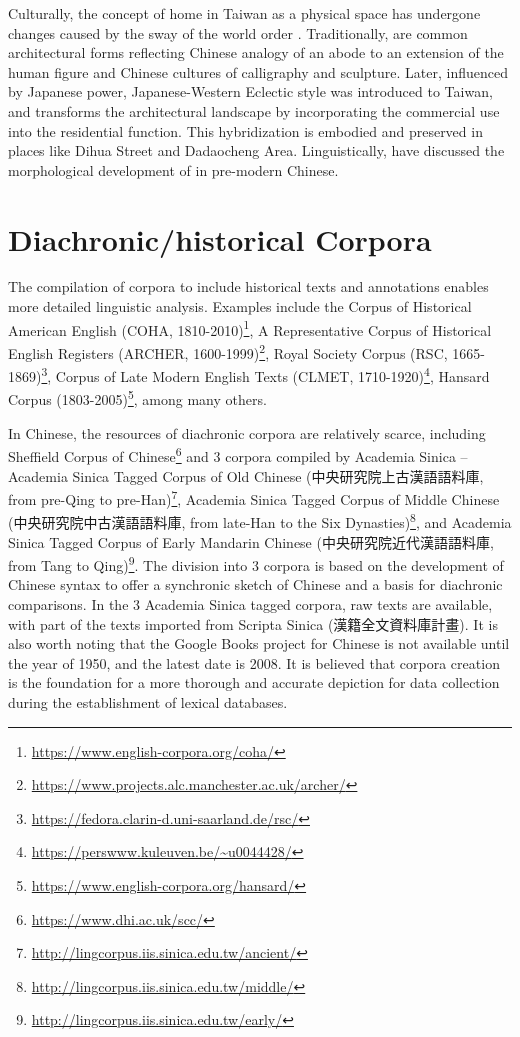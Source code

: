 Culturally, the concept of home in Taiwan as a physical space has undergone changes caused by the sway of the world order \parencite{沈孟穎2015台灣現代住宅設計之轉化}. Traditionally,  are common architectural forms reflecting Chinese analogy of an abode to an extension of the human figure and Chinese cultures of calligraphy and sculpture. Later, influenced by Japanese power, Japanese-Western Eclectic style was introduced to Taiwan, and  transforms the architectural landscape by incorporating the commercial use into the residential function. This hybridization is embodied and preserved in places like Dihua Street and Dadaocheng Area. Linguistically, \textcite{wang2005jia} have discussed the morphological development of \jia in pre-modern Chinese.

\section{Diachronic/historical Corpora}
The compilation of corpora to include historical texts and annotations enables more detailed linguistic analysis. Examples include
the Corpus of Historical American English (COHA, 1810-2010)\footnote{\url{https://www.english-corpora.org/coha/}},
A Representative Corpus of Historical English Registers (ARCHER, 1600-1999)\footnote{\url{https://www.projects.alc.manchester.ac.uk/archer/}},
Royal Society Corpus (RSC, 1665-1869)\footnote{\url{https://fedora.clarin-d.uni-saarland.de/rsc/}},
Corpus of Late Modern English Texts (CLMET, 1710-1920)\footnote{\url{https://perswww.kuleuven.be/~u0044428/}}, 
Hansard Corpus (1803-2005)\footnote{\url{https://www.english-corpora.org/hansard/}}, among many others.

In Chinese, the resources of diachronic corpora are relatively scarce, including Sheffield Corpus of Chinese\footnote{\url{https://www.dhi.ac.uk/scc/}} and 3 corpora compiled by Academia Sinica \parencite{wei1997corpus}--Academia Sinica Tagged Corpus of Old Chinese (中央研究院上古漢語語料庫, from pre-Qing to pre-Han)\footnote{\url{http://lingcorpus.iis.sinica.edu.tw/ancient/}}, Academia Sinica Tagged Corpus of Middle Chinese (中央研究院中古漢語語料庫, from late-Han to the Six Dynasties)\footnote{\url{http://lingcorpus.iis.sinica.edu.tw/middle/}}, and Academia Sinica Tagged Corpus of Early Mandarin Chinese (中央研究院近代漢語語料庫, from Tang to Qing)\footnote{\url{http://lingcorpus.iis.sinica.edu.tw/early/}}. The division into 3 corpora is based on the development of Chinese syntax to offer a synchronic sketch of Chinese and a basis for diachronic comparisons. In the 3 Academia Sinica tagged corpora, raw texts are available, with part of the texts imported from Scripta Sinica (漢籍全文資料庫計畫). It is also worth noting that the Google Books project for Chinese is not available until the year of 1950, and the latest date is 2008. It is believed that corpora creation is the foundation for a more thorough and accurate depiction for data collection during the establishment of lexical databases.

